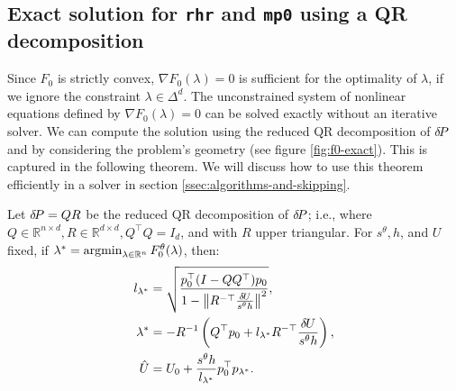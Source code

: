 \documentclass[smallcondensed]{svjour3}
\begin{document}

\subsection{Exact solution for \texttt{rhr} and \texttt{mp0} using a
  QR decomposition}\label{ssec:exact-soln}

Since $F_0$ is strictly convex, $\nabla F_0(\lambda) = 0$ is
sufficient for the optimality of $\lambda$, if we ignore the
constraint $\lambda \in \Delta^d$. The unconstrained system of
nonlinear equations defined by $\nabla F_0(\lambda) = 0$ can be solved
exactly without an iterative solver. We can compute the solution using
the reduced QR decomposition of ${\delta \hspace{-0.14em} P}$ and by considering the
problem's geometry (see figure \ref{fig:f0-exact}). This is captured
in the following theorem. We will discuss how to use this theorem
efficiently in a solver in section\@
\ref{ssec:algorithms-and-skipping}.

\begin{theorem}\label{thm:f0-exact}
  Let ${\delta \hspace{-0.14em} P} = QR$ be the reduced QR decomposition of ${\delta \hspace{-0.14em} P}$; i.e.,
  where
  $Q \in \mathbb{R}^{n \times d}, R \in \mathbb{R}^{d \times d},
  Q^\top Q = I_d$, and with $R$ upper triangular. For $s^\theta, h$,
  and $U$ fixed, if
  $\lambda^* = \operatorname{argmin}_{\lambda \in \mathbb{R}^n}
  F_0^\theta(\lambda)$, then:
  \begin{align}
    l_{\lambda^*} &= \sqrt{\frac{p_0^\top {(I - QQ^\top)} p_0}{1 - \left\|R^{-\top} \frac{{\delta \hspace{-0.09em} U}}{s^\theta h}\right\|^2}},\label{eq:l-star-expression} \\
    \lambda^* &= -R^{-1} \left(Q^\top p_0 + l_{\lambda^*} R^{-\top} \frac{{\delta \hspace{-0.09em} U}}{s^\theta h}\right),\label{eq:f0-exact-lambda} \\
    \hat{U} &= U_0 + \frac{s^\theta h}{l_{\lambda^*}} p_0^\top p_{\lambda^*}.\label{eq:f0-exact}
  \end{align}
\end{theorem}
\end{document}
